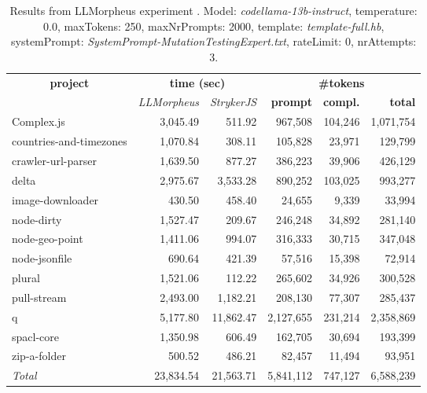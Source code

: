 
\begin{table*}[hbt!]
\centering
{\scriptsize
\begin{tabular}{l||r|r|r|r|r}
\multicolumn{1}{c|}{\bf project} & \multicolumn{2}{|c|}{\bf time (sec)} & \multicolumn{3}{|c|}{\bf \#tokens} \\
               & {\it LLMorpheus} & {\it StrykerJS} & {\bf prompt} & {\bf compl.} & {\bf total} \\
\hline
  Complex.js & 3,045.49 & 511.92 & 967,508 & 104,246 & 1,071,754 \\ 
countries-and-timezones & 1,070.84 & 308.11 & 105,828 & 23,971 & 129,799 \\ 
crawler-url-parser & 1,639.50 & 877.27 & 386,223 & 39,906 & 426,129 \\ 
delta & 2,975.67 & 3,533.28 & 890,252 & 103,025 & 993,277 \\ 
image-downloader & 430.50 & 458.40 & 24,655 & 9,339 & 33,994 \\ 
node-dirty & 1,527.47 & 209.67 & 246,248 & 34,892 & 281,140 \\ 
node-geo-point & 1,411.06 & 994.07 & 316,333 & 30,715 & 347,048 \\ 
node-jsonfile & 690.64 & 421.39 & 57,516 & 15,398 & 72,914 \\ 
plural & 1,521.06 & 112.22 & 265,602 & 34,926 & 300,528 \\ 
pull-stream & 2,493.00 & 1,182.21 & 208,130 & 77,307 & 285,437 \\ 
q & 5,177.80 & 11,862.47 & 2,127,655 & 231,214 & 2,358,869 \\ 
spacl-core & 1,350.98 & 606.49 & 162,705 & 30,694 & 193,399 \\ 
zip-a-folder & 500.52 & 486.21 & 82,457 & 11,494 & 93,951 \\ 
\hline
  \textit{Total} & 23,834.54 & 21,563.71 & 5,841,112 & 747,127 & 6,588,239 \\
  \end{tabular}
  }
  \\[2mm]
  \caption{Results from LLMorpheus experiment .
    Model: \textit{codellama-13b-instruct}, 
    temperature: 0.0, 
    maxTokens: 250, 
    maxNrPrompts: 2000, 
    template: \textit{template-full.hb}, 
    systemPrompt: \textit{SystemPrompt-MutationTestingExpert.txt}, 
    rateLimit: 0, 
    nrAttempts: 3.  
  }
  \label{table:Cost:run358:codellama-13b-instruct:template-full.hb:0.0}
\end{table*}